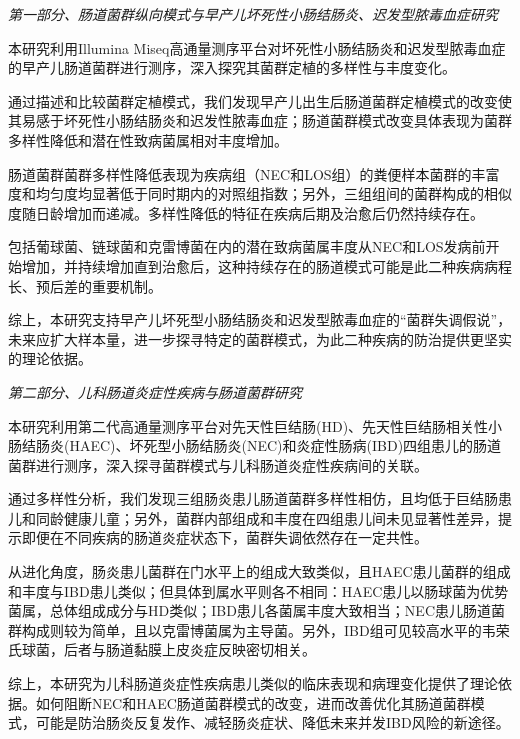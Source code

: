 
\begin{summary}
\textit{第一部分、肠道菌群纵向模式与早产儿坏死性小肠结肠炎、迟发型脓毒血症研究}

  本研究利用Illumina Miseq高通量测序平台对坏死性小肠结肠炎和迟发型脓毒血症的早产儿肠道菌群进行测序，深入探究其菌群定植的多样性与丰度变化。

  通过描述和比较菌群定植模式，我们发现早产儿出生后肠道菌群定植模式的改变使其易感于坏死性小肠结肠炎和迟发性脓毒血症；肠道菌群模式改变具体表现为菌群多样性降低和潜在性致病菌属相对丰度增加。

  肠道菌群菌群多样性降低表现为疾病组（NEC和LOS组）的粪便样本菌群的丰富度和均匀度均显著低于同时期内的对照组指数；另外，三组组间的菌群构成的相似度随日龄增加而递减。多样性降低的特征在疾病后期及治愈后仍然持续存在。

  包括葡球菌、链球菌和克雷博菌在内的潜在致病菌属丰度从NEC和LOS发病前开始增加，并持续增加直到治愈后，这种持续存在的肠道模式可能是此二种疾病病程长、预后差的重要机制。

  综上，本研究支持早产儿坏死型小肠结肠炎和迟发型脓毒血症的“菌群失调假说”，未来应扩大样本量，进一步探寻特定的菌群模式，为此二种疾病的防治提供更坚实的理论依据。

\textit{第二部分、儿科肠道炎症性疾病与肠道菌群研究}

  本研究利用第二代高通量测序平台对先天性巨结肠(HD)、先天性巨结肠相关性小肠结肠炎(HAEC)、坏死型小肠结肠炎(NEC)和炎症性肠病(IBD)四组患儿的肠道菌群进行测序，深入探寻菌群模式与儿科肠道炎症性疾病间的关联。

  通过多样性分析，我们发现三组肠炎患儿肠道菌群多样性相仿，且均低于巨结肠患儿和同龄健康儿童；另外，菌群内部组成和丰度在四组患儿间未见显著性差异，提示即便在不同疾病的肠道炎症状态下，菌群失调依然存在一定共性。

  从进化角度，肠炎患儿菌群在门水平上的组成大致类似，且HAEC患儿菌群的组成和丰度与IBD患儿类似；但具体到属水平则各不相同：HAEC患儿以肠球菌为优势菌属，总体组成成分与HD类似；IBD患儿各菌属丰度大致相当；NEC患儿肠道菌群构成则较为简单，且以克雷博菌属为主导菌。另外，IBD组可见较高水平的韦荣氏球菌，后者与肠道黏膜上皮炎症反映密切相关。

  综上，本研究为儿科肠道炎症性疾病患儿类似的临床表现和病理变化提供了理论依据。如何阻断NEC和HAEC肠道菌群模式的改变，进而改善优化其肠道菌群模式，可能是防治肠炎反复发作、减轻肠炎症状、降低未来并发IBD风险的新途径。

\end{summary}
